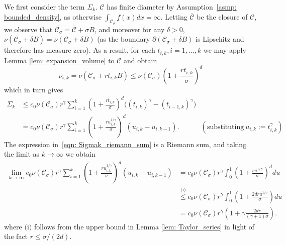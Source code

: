 \documentclass[11pt,twoside]{article}
\theoremstyle{definition}
\newcommand{\1}{\mathbbm{1}}
\newcommand{\Cset}{\mathcal{C}}
\newcommand{\Csig}{\Cset_{\sigma}}
\begin{document}
	We first consider the term $\Sigma_k$. $\Cset$ has finite diameter by Assumption~\ref{asmp: bounded_density}, as otherwise $\int_{\Csig} f(x) dx = \infty$. Letting $\overline{\Cset}$ be the closure of $\Cset$, we observe that $\overline{\Csig} = \overline{\Cset} + \sigma B$, and moreover for any $\delta > 0$, $\nu(\overline{\Csig} + \delta B) = \nu(\Csig + \delta B)$ (as the boundary $\partial(\Csig + \delta B)$ is Lipschitz and therefore has measure zero). As a result, for each $t_{i,k}, i = 1, \ldots,k$ we may apply Lemma \ref{lem: expansion_volume} to $\overline{\Cset}$ and obtain
	\begin{equation}
	\label{eqn: slice_volume_bound}
	\nu_{i,k} = \nu(\Csig + rt_{i,k}B) \leq \nu(\Csig)\left(1 + \frac{rt_{i,k}}{\sigma}\right)^d
	\end{equation}
	which in turn gives
	\begin{align}
	\Sigma_k & \leq c_0\nu(\Csig) r^\gamma \sum_{i = 1}^{k} \left(1 + \frac{ rt_{i,k}}{\sigma}\right)^d \biggl( (t_{i,k})^{\gamma} - (t_{i-1,k})^{\gamma}\biggr) \nonumber \\
	& = c_0\nu(\Csig) r^\gamma \sum_{i = 1}^{k} \left(1 + \frac{ru_{i,k}^{1/\gamma}}{\sigma}\right)^d ( u_{i,k} - u_{i,k-1}).~~~~~~~~~~~~~~ (\text{substituting}~u_{i,k} := t_{i,k}^{\gamma}) \label{eqn: Sigmak_riemann_sum}
	\end{align}
	The expression in~\eqref{eqn: Sigmak_riemann_sum} is a Riemann sum, and taking the limit as $k \to \infty$ we obtain
	\begin{align}
	\lim_{k \to \infty} c_0\nu(\Csig) r^\gamma \sum_{i = 1}^{k} \left(1 + \frac{ru_{i,k}^{1/\gamma}}{\sigma}\right)^d ( u_{i,k} - u_{i,k-1}) & = c_0\nu(\Csig) r^\gamma \int_{0}^{1} \left(1 + \frac{r u^{1/\gamma}}{\sigma}\right)^{d} du \nonumber \\
	& \overset{\text{(i)}}{\leq} c_0\nu(\Csig) r^\gamma \int_{0}^{1} \left(1 + \frac{2 d r u^{1/\gamma}}{\sigma}\right) du \nonumber \\
	& = c_0\nu(\Csig) r^\gamma \left(1 + \gamma \frac{2 d r}{(\gamma + 1)\sigma}\right). \label{eqn: Sigmak_integral}
	\end{align}
	where $\text{(i)}$ follows from the upper bound in Lemma \ref{lem: Taylor_series} in light of the fact $r \leq \sigma/(2d)$. 
	
\end{document}
